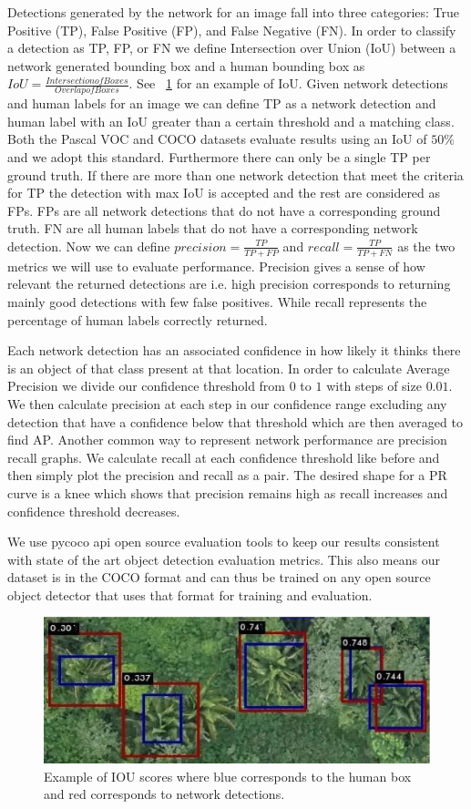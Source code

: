 Detections generated by the network for an image fall into three categories: True Positive (TP), False Positive (FP), and False Negative (FN). In order to classify a detection as TP, FP, or FN we define Intersection over Union (IoU) between a network generated bounding box and a human bounding box as $IoU = \frac{Intersection of Boxes}{Overlap of Boxes}$. See ~\ref{fig:IOU} for an example of IoU. Given network detections and human labels for an image we can define TP as a network detection and human label with an IoU greater than a certain threshold and a matching class. Both the Pascal VOC and COCO datasets evaluate results using an IoU of $50\%$ and we adopt this standard. Furthermore there can only be a single TP per ground truth. If there are more than one network detection that meet the criteria for TP the detection with max IoU is accepted and the rest are considered as FPs. FPs are all network detections that do not have a corresponding ground truth. FN are all human labels that do not have a corresponding network detection. Now we can define $precision = \frac{TP}{TP+FP}$ and $recall = \frac{TP}{TP + FN}$ as the two metrics we will use to evaluate performance. Precision gives a sense of how relevant the returned detections are i.e. high precision corresponds to returning mainly good detections with few false positives. While recall represents the percentage of human labels correctly returned.

Each network detection has an associated confidence in how likely it thinks there is an object of that class present at that location. In order to calculate Average Precision we divide our confidence threshold from $0$ to $1$ with steps of size $0.01$. We then calculate precision at each step in our confidence range excluding any detection that have a confidence below that threshold which are then averaged to find AP. Another common way to represent network performance are precision recall graphs. We calculate recall at each confidence threshold like before and then simply plot the precision and recall as a pair. The desired shape for a PR curve is a knee which shows that precision remains high as recall increases and confidence threshold decreases.

We use pycoco api open source evaluation tools \cite{COCO} to keep our results consistent with state of the art object detection evaluation metrics. This also means our dataset is in the COCO format and can thus be trained on any open source object detector that uses that format for training and evaluation.

\begin{figure}[ht]
\includegraphics[width=1.0\textwidth]{Figures/IOU.png}
\caption{Example of IOU scores where blue corresponds to the human box and red corresponds to network detections.}
\label{fig:IOU}
\end{figure}
